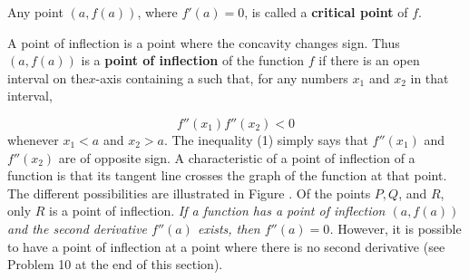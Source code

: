 Any point $(a, f(a))$, where $f'(a) = 0$, is called a \textbf{critical point} of $f$.

A point of inflection is a point where the concavity changes sign. Thus $(a,f(a))$ is a \textbf{point of inflection} of the function $f$ if there is an open interval on the$x$-axis containing a such that, for any numbers $x_1$ and $x_2$ in that interval,

\begin{equation}
f''(x_1)f''(x_2) < 0 
\label{eq2.1.1}
\end{equation}
\noindent whenever $x_1 < a$ and $x_2 > a$. The inequality (1) simply says that $f''(x_1)$ and $f''(x_2)$ are of opposite sign. A characteristic of a point of inflection of a function is that its tangent line crosses the graph of the function at that point. The different possibilities are illustrated in Figure . Of the points $P, Q$, and $R$, only $R$ is a point of inflection. \textit{If a function has a point of inflection $(a, f(a))$ and the second derivative $f''(a)$ exists, then $f''(a) = 0$.} However, it is possible to have a point of inflection at a point where there is no second derivative (see Problem 10 at the end of this section).
\medskip


